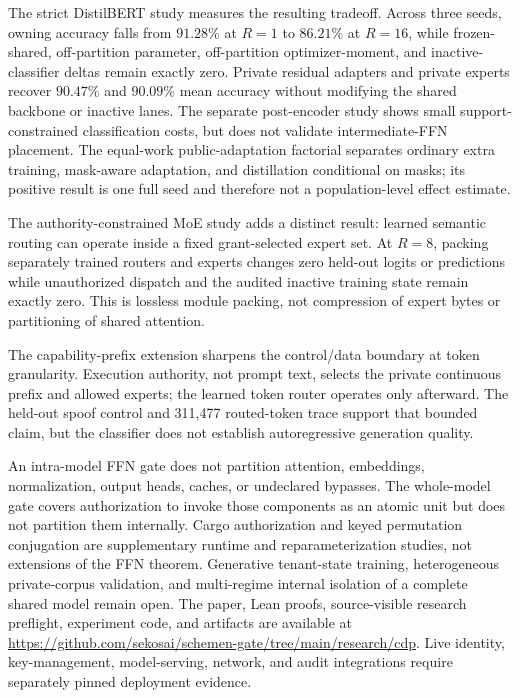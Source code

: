 \documentclass[11pt,a4paper]{article}
\begin{document}
The strict DistilBERT study measures the resulting tradeoff.  Across
three seeds, owning accuracy falls from $91.28\%$ at $R{=}1$ to
$86.21\%$ at $R{=}16$, while frozen-shared, off-partition parameter,
off-partition optimizer-moment, and inactive-classifier deltas remain
exactly zero.  Private residual adapters and private experts recover
$90.47\%$ and $90.09\%$ mean accuracy without modifying the shared
backbone or inactive lanes.  The separate post-encoder study shows
small support-constrained classification costs, but does not validate
intermediate-FFN placement. The equal-work public-adaptation factorial separates
ordinary extra training, mask-aware adaptation, and distillation conditional on
masks; its positive result is one full seed and therefore not a
population-level effect estimate.

The authority-constrained MoE study adds a distinct result: learned semantic
routing can operate inside a fixed grant-selected expert set. At $R{=}8$,
packing separately trained routers and experts changes zero held-out logits or
predictions while unauthorized dispatch and the audited inactive training
state remain exactly zero. This is lossless module packing, not compression of
expert bytes or partitioning of shared attention.

The capability-prefix extension sharpens the control/data boundary at token
granularity. Execution authority, not prompt text, selects the private continuous
prefix and allowed experts; the learned token router operates only afterward.
The held-out spoof control and 311,477 routed-token trace support that bounded
claim, but the classifier does not establish autoregressive generation quality.

An intra-model FFN gate does not partition attention, embeddings,
normalization, output heads, caches, or undeclared bypasses.  The
whole-model gate covers authorization to invoke those components as an
atomic unit but does not partition them internally.  Cargo
authorization and keyed permutation conjugation are supplementary
runtime and reparameterization studies, not extensions of the FFN
theorem.
Generative tenant-state training, heterogeneous private-corpus
validation, and multi-regime internal isolation of a complete shared
model remain open.  The
paper, Lean proofs, source-visible research preflight, experiment code, and
artifacts are available at
\url{https://github.com/sekosai/schemen-gate/tree/main/research/cdp}.
Live identity, key-management, model-serving, network, and audit
integrations require separately pinned deployment evidence.
\end{document}
